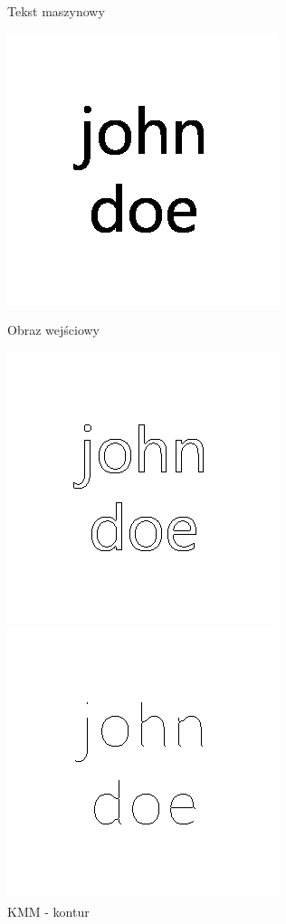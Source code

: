\documentclass[11pt]{article}
\begin{document}
\begin{figure}[!ht] 
  \caption{Tekst maszynowy}
  \label{ fig7} 
  \begin{minipage}[b]{0.5\linewidth}
    \centering
    \includegraphics[width=.5\linewidth]{../images/text} 
    \caption{Obraz wejściowy} 
    \vspace{4ex}
  \end{minipage}%
  \begin{minipage}[b]{0.5\linewidth}
    \centering
    \includegraphics[width=.5\linewidth]{../samples/text_kmm_contour} 
    \caption{KMM - kontur} 
    \vspace{4ex}
  \end{minipage} 
  \begin{minipage}[b]{0.5\linewidth}
    \centering
    \includegraphics[width=.5\linewidth]{../samples/text_kmm} 

\end{minipage}
\end{figure}
\end{document}
